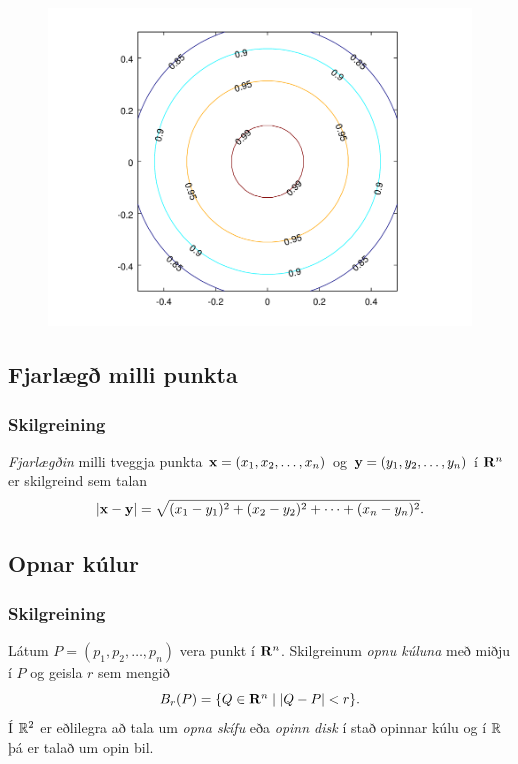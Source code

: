 \begin{figure}[h]
\begin{center} 
\includegraphics{contour.png} 
\caption*{ }
\end{center}
\end{figure}  


\subsection{Fjarlægð milli punkta}
\subsubsection{Skilgreining }
 {\em Fjarlægðin} milli tveggja punkta 
$\mbox{${\bf x}$}=(x_1,x_2, \ldots,x_n)$ og $\mbox{${\bf y}$}=(y_1,y_2, \ldots,y_n)$ í $\mbox{${\bf R}^n$}$ er skilgreind sem talan
$$|\mbox{${\bf x}$}-\mbox{${\bf y}$}|=\sqrt{(x_1-y_1)^2+(x_2-y_2)^2+\cdots+(x_n-y_n)^2}.$$
 



\subsection{Opnar kúlur}
 \subsubsection{Skilgreining }
  Látum $P=(p_1,p_2,\ldots,p_n)$ vera punkt í
$\mbox{${\bf R}^n$}$.  Skilgreinum {\em opnu kúluna} með miðju í $P$ og geisla $r$ sem
mengið  
$$B_r(P)=\{Q\in\mbox{${\bf R}^n$}\mid |Q-P|<r\}.$$
Í ${\mathbb R}^2$ er eðlilegra að tala um {\em opna skífu} eða {\em opinn disk} í stað opinnar kúlu og í ${\mathbb R}$ þá er talað um opin bil.  

